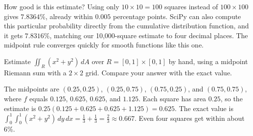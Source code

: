 How good is this estimate? Using only $10 \times 10 = 100$ squares instead of
$100 \times 100$ gives $7.8364\%$, already within $0.005$ percentage points.
SciPy can also compute this particular probability directly from the
cumulative distribution function, and it gets $7.8316\%$, matching our
10,000-square estimate to four decimal places. The midpoint rule converges
quickly for smooth functions like this one.

\begin{Exercise}[label = numint1]
Estimate $\iint_R (x^2 + y^2)\,dA$ over $R = [0, 1] \times [0, 1]$ by hand, using a
midpoint Riemann sum with a $2 \times 2$ grid. Compare your answer with the exact
value.
\end{Exercise}

\begin{Answer}[ref = numint1]
The midpoints are $(0.25, 0.25)$, $(0.25, 0.75)$, $(0.75, 0.25)$, and $(0.75, 0.75)$,
where $f$ equals $0.125$, $0.625$, $0.625$, and $1.125$. Each square has area
$0.25$, so the estimate is $0.25(0.125 + 0.625 + 0.625 + 1.125) = 0.625$. The exact
value is $\int_0^1\int_0^1 (x^2 + y^2)\,dy\,dx = \frac{1}{3} + \frac{1}{3} = \frac{2}{3}
\approx 0.667$. Even four squares get within about 6\%.
\end{Answer}

